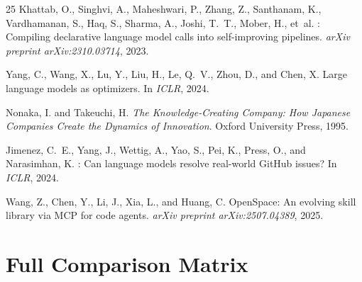 \documentclass{article}
\begin{document}
\begin{thebibliography}{25}
Khattab, O., Singhvi, A., Maheshwari, P., Zhang, Z., Santhanam, K., Vardhamanan, S., Haq, S., Sharma, A., Joshi, T.~T., Mober, H., et~al.
: Compiling declarative language model calls into self-improving pipelines.
\newblock \emph{arXiv preprint arXiv:2310.03714}, 2023.

Yang, C., Wang, X., Lu, Y., Liu, H., Le, Q.~V., Zhou, D., and Chen, X.
\newblock Large language models as optimizers.
\newblock In \emph{ICLR}, 2024.

Nonaka, I. and Takeuchi, H.
\newblock \emph{The Knowledge-Creating Company: How Japanese Companies Create the Dynamics of Innovation}.
\newblock Oxford University Press, 1995.

Jimenez, C.~E., Yang, J., Wettig, A., Yao, S., Pei, K., Press, O., and Narasimhan, K.
: Can language models resolve real-world {GitHub} issues?
\newblock In \emph{ICLR}, 2024.

Wang, Z., Chen, Y., Li, J., Xia, L., and Huang, C.
\newblock OpenSpace: An evolving skill library via {MCP} for code agents.
\newblock \emph{arXiv preprint arXiv:2507.04389}, 2025.

\end{thebibliography}

\newpage
\appendix

\section{Full Comparison Matrix}
\label{app:matrix}
\end{document}
